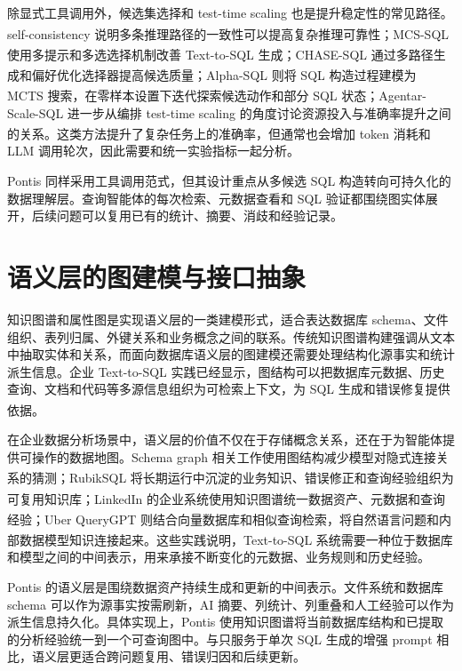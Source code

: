 \documentclass[
    bachelor,
    pdflinks,
]{xjtuthesis}
\newcommand{\upcite}[1]{\textsuperscript{\cite{#1}}}
\begin{document}
除显式工具调用外，候选集选择和 test-time scaling 也是提升稳定性的常见路径。self-consistency\upcite{wang2023selfConsistency} 说明多条推理路径的一致性可以提高复杂推理可靠性；MCS-SQL 使用多提示和多选选择机制改善 Text-to-SQL 生成\upcite{lee2024mcssql}；CHASE-SQL 通过多路径生成和偏好优化选择器提高候选质量\upcite{pourreza2024chasesql}；Alpha-SQL 则将 SQL 构造过程建模为 MCTS 搜索，在零样本设置下迭代探索候选动作和部分 SQL 状态\upcite{li2025alphasql}；Agentar-Scale-SQL 进一步从编排 test-time scaling 的角度讨论资源投入与准确率提升之间的关系\upcite{wang2025agentarScaleSQL}。这类方法提升了复杂任务上的准确率，但通常也会增加 token 消耗和 LLM 调用轮次，因此需要和统一实验指标一起分析。

Pontis 同样采用工具调用范式，但其设计重点从多候选 SQL 构造转向可持久化的数据理解层。查询智能体的每次检索、元数据查看和 SQL 验证都围绕图实体展开，后续问题可以复用已有的统计、摘要、消歧和经验记录。

\section{语义层的图建模与接口抽象}

知识图谱和属性图是实现语义层的一类建模形式，适合表达数据库 schema、文件组织、表列归属、外键关系和业务概念之间的联系。传统知识图谱构建强调从文本中抽取实体和关系，而面向数据库语义层的图建模还需要处理结构化源事实和统计派生信息。企业 Text-to-SQL 实践已经显示，图结构可以把数据库元数据、历史查询、文档和代码等多源信息组织为可检索上下文，为 SQL 生成和错误修复提供依据\upcite{chen2025enterpriseTextToSQL}。

在企业数据分析场景中，语义层的价值不仅在于存储概念关系，还在于为智能体提供可操作的数据地图。Schema graph 相关工作使用图结构减少模型对隐式连接关系的猜测\upcite{wang2025schemaGraphQA}；RubikSQL 将长期运行中沉淀的业务知识、错误修正和查询经验组织为可复用知识库\upcite{chen2025rubiksql}；LinkedIn 的企业系统使用知识图谱统一数据资产、元数据和查询经验\upcite{chen2025enterpriseTextToSQL}；Uber QueryGPT 则结合向量数据库和相似查询检索，将自然语言问题和内部数据模型知识连接起来\upcite{johnson2024querygpt}。这些实践说明，Text-to-SQL 系统需要一种位于数据库和模型之间的中间表示，用来承接不断变化的元数据、业务规则和历史经验。

Pontis 的语义层是围绕数据资产持续生成和更新的中间表示。文件系统和数据库 schema 可以作为源事实按需刷新，AI 摘要、列统计、列重叠和人工经验可以作为派生信息持久化。具体实现上，Pontis 使用知识图谱将当前数据库结构和已提取的分析经验统一到一个可查询图中。与只服务于单次 SQL 生成的增强 prompt 相比，语义层更适合跨问题复用、错误归因和后续更新。
\end{document}
